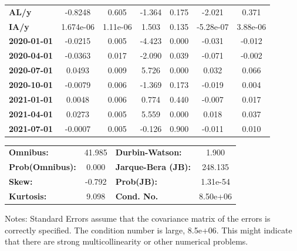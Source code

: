 \begin{center}
\begin{tabular}{lcccccc}
\textbf{AL/y}        &      -0.8248  &        0.605     &    -1.364  &         0.175        &       -2.021    &        0.371     \\
\textbf{IA/y}        &    1.674e-06  &     1.11e-06     &     1.503  &         0.135        &    -5.28e-07    &     3.88e-06     \\
\textbf{2020-01-01}  &      -0.0215  &        0.005     &    -4.423  &         0.000        &       -0.031    &       -0.012     \\
\textbf{2020-04-01}  &      -0.0363  &        0.017     &    -2.090  &         0.039        &       -0.071    &       -0.002     \\
\textbf{2020-07-01}  &       0.0493  &        0.009     &     5.726  &         0.000        &        0.032    &        0.066     \\
\textbf{2020-10-01}  &      -0.0079  &        0.006     &    -1.369  &         0.173        &       -0.019    &        0.004     \\
\textbf{2021-01-01}  &       0.0048  &        0.006     &     0.774  &         0.440        &       -0.007    &        0.017     \\
\textbf{2021-04-01}  &       0.0273  &        0.005     &     5.559  &         0.000        &        0.018    &        0.037     \\
\textbf{2021-07-01}  &      -0.0007  &        0.005     &    -0.126  &         0.900        &       -0.011    &        0.010     \\
\bottomrule
\end{tabular}
\begin{tabular}{lclc}
\textbf{Omnibus:}       & 41.985 & \textbf{  Durbin-Watson:     } &    1.900  \\
\textbf{Prob(Omnibus):} &  0.000 & \textbf{  Jarque-Bera (JB):  } &  248.135  \\
\textbf{Skew:}          & -0.792 & \textbf{  Prob(JB):          } & 1.31e-54  \\
\textbf{Kurtosis:}      &  9.098 & \textbf{  Cond. No.          } & 8.50e+06  \\
\bottomrule
\end{tabular}
\end{center}

Notes: \newline
 [1] Standard Errors assume that the covariance matrix of the errors is correctly specified. \newline
 [2] The condition number is large, 8.5e+06. This might indicate that there are \newline
 strong multicollinearity or other numerical problems.